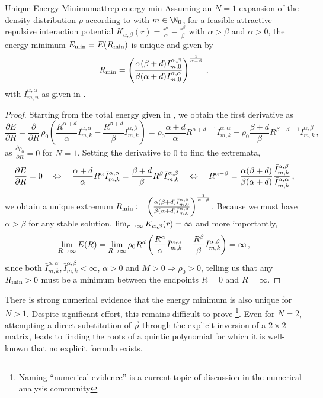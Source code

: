 \begin{lemma}{Unique Energy Minimum}{attrep-energy-min}
  Assuming an $N=1$ expansion of the density distribution $\rho$ according to  with $m \in \N_0$, for a feasible attractive-repulsive interaction potential $K_{\alpha, \beta}(r) = \frac{r^\alpha}{\alpha} - \frac{r^\beta}{\beta}$ with $\alpha > \beta$ and $\alpha > 0$, the energy minimum $E_{\rm min} = E(R_{\rm min})$ is unique and given by
  $$R_{\rm min} = \left(\frac{\alpha(\beta+d) \bar{I}_{m,0}^{\alpha,\beta}}{\beta(\alpha+d) \bar{I}_{m,0}^{\alpha,\alpha}}\right)^\frac{1}{\alpha-\beta}\,,$$
  with $\bar{I}_{m,n}^{\alpha,\alpha}$ as given in .
\end{lemma}
\begin{proof}
  Starting from the total energy given in , we obtain the first derivative as
  $$\frac{\partial E}{\partial R} = \frac{\partial}{\partial R}\, \rho_0 \left(\frac{R^{\alpha+d}}{\alpha} \bar{I}_{m,k}^{\alpha,\alpha} - \frac{R^{\beta+d}}{\beta} \bar{I}_{m,k}^{\alpha,\beta}\right) = \rho_0 \frac{\alpha+d}{\alpha} R^{\alpha+d-1} \bar{I}_{m,k}^{\alpha,\alpha} - \rho_0 \frac{\beta+d}{\beta} R^{\beta+d-1} \bar{I}_{m,k}^{\alpha,\beta}\,,$$
  as $\frac{\partial \rho_0}{\partial R} = 0$ for $N = 1$.
  Setting the derivative to $0$ to find the extremata,
  $$\frac{\partial E}{\partial R} = 0 \quad\Leftrightarrow\quad \frac{\alpha+d}{\alpha} R^{\alpha} \bar{I}_{m,k}^{\alpha,\alpha} = \frac{\beta+d}{\beta} R^{\beta} \bar{I}_{m,k}^{\alpha,\beta} \quad\Leftrightarrow\quad R^{\alpha-\beta} = \frac{\alpha (\beta+d)}{\beta(\alpha+d)} \frac{\bar{I}_{m,k}^{\alpha,\beta}}{\bar{I}_{m,k}^{\alpha,\alpha}}\,,$$
  we obtain a unique extremum $R_{\rm min} := \left(\frac{\alpha(\beta+d) \bar{I}_{m,0}^{\alpha,\beta}}{\beta(\alpha+d) \bar{I}_{m,0}^{\alpha,\alpha}}\right)^\frac{1}{\alpha-\beta}$.
  Because we must have $\alpha > \beta$ for any stable solution, $\lim_{r \rightarrow \infty} K_{\alpha,\beta}(r) = \infty$ and more importantly,
  $$\lim_{R \rightarrow \infty} E(R) = \lim_{R \rightarrow \infty} \rho_0 R^d \left(\frac{R^{\alpha}}{\alpha} \bar{I}_{m,k}^{\alpha,\alpha} - \frac{R^{\beta}}{\beta} \bar{I}_{m,k}^{\alpha,\beta}\right) = \infty\,,$$
  since both $\bar{I}_{m,k}^{\alpha,\alpha}, \bar{I}_{m,k}^{\alpha,\beta} < \infty$, $\alpha > 0$ and $M > 0 \Rightarrow \rho_0 > 0$, telling us that any $R_{\rm min} > 0$ must be a minimum between the endpoints $R = 0$ and $R = \infty$.
\end{proof}

There is strong numerical evidence that the energy minimum is also unique for $N > 1$.
Despite significant effort, this remains difficult to prove \footnote{Naming ``numerical evidence'' is a current topic of discussion in the numerical analysis community}.
Even for $N = 2$, attempting a direct substitution of $\vec{\rho}$ through the explicit inversion of a $2 \times 2$ matrix, leads to finding the roots of a quintic polynomial for which it is well-known that no explicit formula exists.

